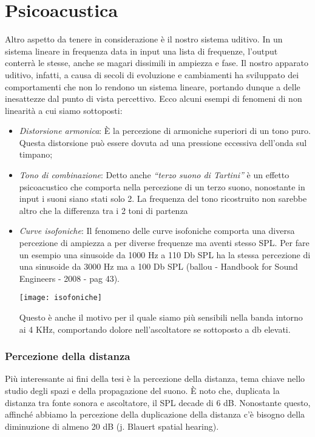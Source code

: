 \section{Psicoacustica}
Altro aspetto da tenere in considerazione è il nostro sistema uditivo. In un sistema lineare in frequenza data in input una lista di frequenze, l’output conterrà le stesse, anche se magari dissimili in ampiezza e fase.
Il nostro apparato uditivo, infatti, a causa di secoli di evoluzione e cambiamenti ha sviluppato dei comportamenti che non lo rendono un sistema lineare, portando dunque a delle inesattezze dal punto di vista percettivo.
Ecco alcuni esempi di fenomeni di non linearità a cui siamo sottoposti:
\begin{itemize}
      \item \emph{Distorsione armonica}:
      È la percezione di armoniche superiori di un tono puro. Questa distorsione può essere dovuta ad una pressione eccessiva dell’onda sul timpano;
      \item \emph{Tono di combinazione}:
Detto anche \textit{“terzo suono di Tartini”} è un effetto psicoacustico che comporta nella percezione di un terzo suono, nonostante in input i suoni siano stati solo 2.
La frequenza del tono ricostruito non sarebbe altro che la differenza tra i 2 toni di partenza
      \item \emph{Curve isofoniche}:
Il fenomeno delle curve isofoniche comporta una diversa percezione di ampiezza a per diverse frequenze ma aventi stesso SPL. Per fare un esempio una sinusoide da 1000 Hz a 110 Db SPL ha la stessa percezione di una sinusoide da 3000 Hz ma a 100 Db SPL (ballou - Handbook for Sound Engineers - 2008 - pag 43).
\begin{center}
\texttt{[image: isofoniche]}
\end{center}
Questo è anche il motivo per il quale siamo più sensibili nella banda intorno ai 4 KHz, comportando dolore nell’ascoltatore se sottoposto a db elevati.
\end{itemize}
\subsubsection*{Percezione della distanza}
Più interessante ai fini della tesi è la percezione della distanza, tema chiave nello studio degli spazi e della propagazione del suono.
È noto che, duplicata la distanza tra fonte sonora e ascoltatore, il SPL decade di 6 dB.
Nonostante questo, affinché abbiamo la percezione della duplicazione della distanza c’è bisogno della diminuzione di almeno 20 dB (j. Blauert spatial hearing).

